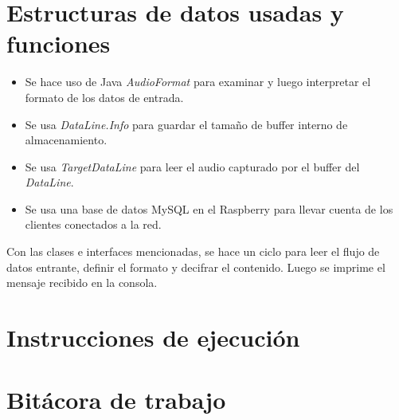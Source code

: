 \documentclass{article}
\begin{document}
\section{Estructuras de datos usadas y funciones}
\begin{itemize}
  \item Se hace uso de Java \emph{AudioFormat} para examinar y luego interpretar el formato de los datos de entrada.
  \item Se usa \emph{DataLine.Info} para guardar el tama\~no de buffer interno de almacenamiento.
  \item Se usa \emph{TargetDataLine} para leer el audio capturado por el buffer del \emph{DataLine}.
  \item Se usa una base de datos MySQL en el Raspberry para llevar cuenta de los clientes conectados a la red.
\end{itemize}

Con las clases e interfaces mencionadas, se hace un ciclo para leer el flujo de datos entrante, definir el formato y decifrar el contenido. Luego se imprime el mensaje recibido en la consola.

\section{Instrucciones de ejecuci\'on}
\section{Bit\'acora de trabajo}
\end{document}

